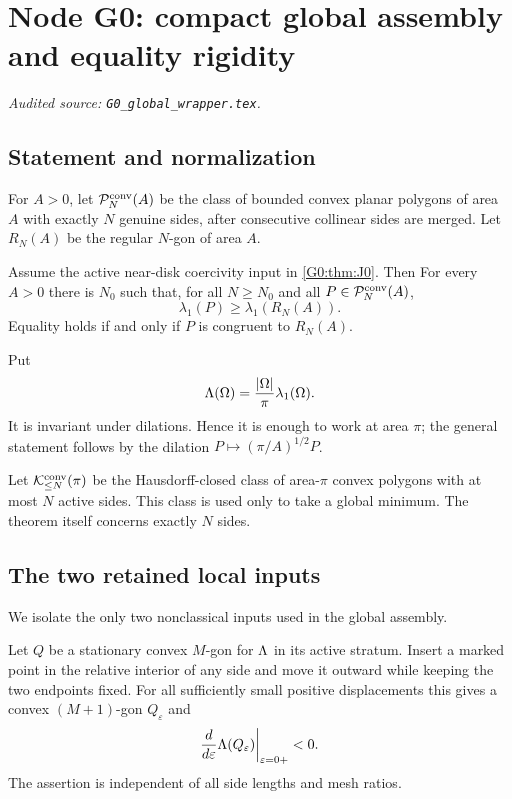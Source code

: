 \begingroup
\section{Node G0: compact global assembly and equality rigidity}
\label{module:G0}
\noindent\textit{Audited source: \nolinkurl{G0_global_wrapper.tex}.}
\subsection{Statement and normalization}

For $A>0$, let $\mathcal P_N^{\rm conv}(A)$ be the class of bounded convex
planar polygons of area $A$ with exactly $N$ genuine sides, after
consecutive collinear sides are merged.  Let $R_N(A)$ be the regular
$N$-gon of area $A$.

\begin{theorem}
\label{G0:thm:main}
Assume the active near-disk coercivity input in
\ref{G0:thm:J0}.  Then
For every $A>0$ there is $N_0$ such that, for all $N\ge N_0$ and all
$P\in\mathcal P_N^{\rm conv}(A)$,
\begin{equation}\label{G0:eq:main}
 \lambda_1(P)\ge\lambda_1(R_N(A)).
\end{equation}
Equality holds if and only if $P$ is congruent to $R_N(A)$.
\end{theorem}

Put
\begin{equation}\label{G0:eq:Lambda}
 \Lambda(\Omega)=\frac{|\Omega|}{\pi}\lambda_1(\Omega).
\end{equation}
It is invariant under dilations.  Hence it is enough to work at area
$\pi$; the general statement follows by the dilation
$P\mapsto(\pi/A)^{1/2}P$.

Let $\mathcal K_{\le N}^{\rm conv}(\pi)$ be the Hausdorff-closed class of
area-$\pi$ convex polygons with at most $N$ active sides.  This class is
used only to take a global minimum.  The theorem itself concerns exactly
$N$ sides.

\subsection{The two retained local inputs}

We isolate the only two nonclassical inputs used in the global assembly.

\begin{theorem}
\label{G0:thm:activation}
Let $Q$ be a stationary convex $M$-gon for $\Lambda$ in its active
stratum.  Insert a marked point in the relative interior of any side and
move it outward while keeping the two endpoints fixed.  For all
sufficiently small positive displacements this gives a convex
$(M+1)$-gon $Q_\varepsilon$ and
\begin{equation}\label{G0:eq:activation}
 \frac d{d\varepsilon}\Lambda(Q_\varepsilon)
 \bigg|_{\varepsilon=0+}<0.
\end{equation}
The assertion is independent of all side lengths and mesh ratios.
\end{theorem}

